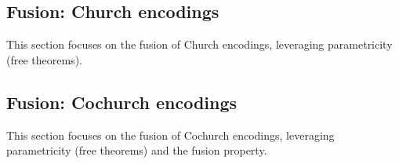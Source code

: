 \subsection{Fusion: Church encodings}
This section focuses on the fusion of Church encodings, leveraging parametricity (free theorems).






\subsection{Fusion: Cochurch encodings}
This section focuses on the fusion of Cochurch encodings, leveraging parametricity (free theorems) and the fusion property.


